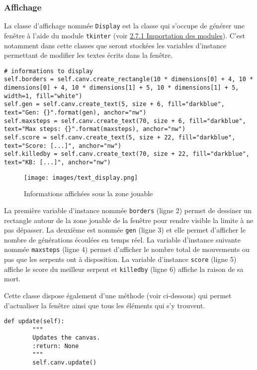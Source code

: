 \documentclass[12pt, a4paper, openany]{book}
\begin{document}
\subsubsection{Affichage}
\label{r:2.7.2-aff}
La classe d'affichage nommée \verb'Display' est la classe qui s'occupe de générer une fenêtre à l'aide du module \verb'tkinter' (voir \hyperref[r:2.7.1-imp]{2.7.1 Importation des modules}). C'est notamment dans cette classes que seront stockées les variables d'instance permettant de modifier les textes écrits dans la fenêtre.
\begin{verbatim}
# informations to display
self.borders = self.canv.create_rectangle(10 * dimensions[0] + 4, 10 * dimensions[0] + 4, 10 * dimensions[1] + 5, 10 * dimensions[1] + 5, width=1, fill="white")
self.gen = self.canv.create_text(5, size + 6, fill="darkblue", text="Gen: {}".format(gen), anchor="nw")
self.maxsteps = self.canv.create_text(70, size + 6, fill="darkblue", text="Max steps: {}".format(maxsteps), anchor="nw")
self.score = self.canv.create_text(5, size + 22, fill="darkblue", text="Score: [...]", anchor="nw")
self.killedby = self.canv.create_text(70, size + 22, fill="darkblue", text="KB: [...]", anchor="nw")
\end{verbatim}
\begin{minipage}{0.2\linewidth}
\begin{figure}[H]
    \centering
    \texttt{[image: images/text\_display.png]}
    \caption{Informations affichées sous la zone jouable}
\end{figure}
\end{minipage}\hfill
\begin{minipage}{0.7\linewidth}
La première variable d'instance nommée \verb'borders' (ligne 2) permet de dessiner un rectangle autour de la zone jouable de la fenêtre pour rendre visible la limite à ne pas dépasser. La deuxième est nommée \verb'gen' (ligne 3) et elle permet d'afficher le nombre de générations écoulées en temps réel. La variable d'instance suivante nommée \verb'maxsteps' (ligne 4) permet d'afficher le nombre total de mouvements ou \og{}pas\fg{} que les serpents ont à disposition. La variable d'instance \verb'score' (ligne 5) affiche le score du meilleur serpent et \verb'killedby' (ligne 6) affiche la raison de sa mort.
\end{minipage}\newline\newline
Cette classe dispose également d'une méthode (voir ci-dessous) qui permet d'actualiser la fenêtre ainsi que tous les éléments qui s'y trouvent.
\begin{verbatim}
def update(self):
        """
        Updates the canvas.
        :return: None
        """
        self.canv.update()
\end{verbatim}
\end{document}
